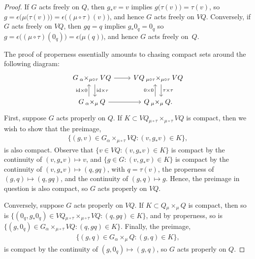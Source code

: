 \documentclass[pdftex]{sigma}
\numberwithin{equation}{section}
\begin{document}
\begin{proof} If $G$ acts freely on $Q$, then $ g _\ast v = v $ implies $ g \bigl( \tau (v) \bigr) = \tau (v) $, so $ g = \epsilon \bigl( \mu \bigl( \tau (v) \bigr) \bigr)= \epsilon \bigl( (\mu \circ \tau) (v) \bigr) $, and hence $G$ acts freely on $ V Q $. Conversely, if $G$ acts freely on $ V Q $, then $ g q = q $ implies $ g _\ast 0 _q = 0 _q $ so $ g = \epsilon \bigl( ( \mu \circ \tau ) ( 0 _q ) \bigr) = \epsilon \bigl( \mu (q) \bigr) $, and hence $G$ acts freely on~$Q$.

The proof of properness essentially amounts to chasing compact sets around the following diagram:
 \begin{equation*}
 \begin{tikzcd}
 G \mathbin{ _\alpha \times _{ \mu \circ \tau } } V Q \arrow[r]
 \arrow[d, shift left=1ex, "\mathrm{id} \times \tau"] & VQ
 \mathbin{ _{\mu \circ \tau } \times _{ \mu \circ
 \tau } } V Q \arrow[d, shift left=1ex, "\tau \times \tau"] \\
 G \mathbin{ _\alpha \times _\mu } Q \arrow[r] \arrow[u, shift
 left=1ex, "\mathrm{id} \times 0 "] & Q \mathbin{ _\mu \times
 _\mu } Q \arrow[u, shift left=1ex, "0 \times 0"] .
 \end{tikzcd}
 \end{equation*}
 First, suppose $G$ acts properly on $Q$. If $ K \subset V Q \mathbin{ _{\mu \circ \tau } \times _{\mu \circ \tau}} V Q $ is compact, then we wish to show that the preimage,
 \begin{gather*}
 \bigl\{ ( g, v ) \in G \mathbin{ _\alpha \times _{ \mu \circ \tau } } V Q \colon ( v, g _\ast v) \in K \bigr\} ,
 \end{gather*}
is also compact. Observe that $ \bigl\{ v \in V Q \colon ( v, g _\ast v) \in K \bigr\} $ is compact by the continuity of $ ( v, g _\ast v ) \mapsto v $, and $ \bigl\{ g \in G \colon ( v, g _\ast v) \in K \bigr\} $ is compact by the continuity of $ ( v, g _\ast v ) \mapsto ( q, g q ) $, with $ q = \tau (v) $, the properness of $ ( g, q ) \mapsto ( q, gq ) $, and the continuity of $ ( g, q ) \mapsto g $. Hence, the preimage in question is also compact, so $G$ acts properly on $ V Q $.

 Conversely, suppose $G$ acts properly on $ V Q $. If $ K \subset Q \mathbin { _\mu \times _\mu } Q $ is compact, then so is $ \bigl\{ ( 0 _q , g _\ast 0 _q ) \in V Q \mathbin{ _{\mu \circ \tau } \times _{\mu \circ \tau}} V Q \colon ( q, g q ) \in K \bigr\} $, and by properness, so is $ \bigl\{ ( g, 0 _q ) \in G \mathbin{ _\alpha \times _{ \mu \circ \tau } } V Q \colon ( q, gq ) \in K \bigr\} $. Finally, the preimage,
 \begin{gather*}
 \bigl\{ ( g, q ) \in G \mathbin { _\alpha \times _\mu } Q \colon ( g, q ) \in K \bigr\},
 \end{gather*}
 is compact by the continuity of $ ( g, 0 _q ) \mapsto ( g, q ) $, so $G$ acts properly on $Q$.
\end{proof}
\end{document}
